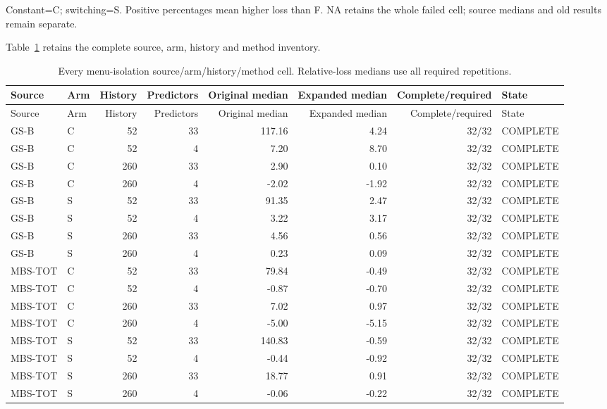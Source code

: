 \documentclass[10pt,a4paper]{article}
\begin{document}
\par\smallskip\noindent\begin{minipage}{\linewidth}\footnotesize Constant=C; switching=S. Positive percentages mean higher loss than F. NA retains the whole failed cell; source medians and old results remain separate.\end{minipage}
Table~\ref{tab:v10-menu-full} retains the complete source, arm, history and method inventory.
\begingroup\scriptsize\renewcommand{\arraystretch}{.96}
\begin{longtable}{llrrrrrl}
\caption{Every menu-isolation source/arm/history/method cell. Relative-loss medians use all required repetitions.}\label{tab:v10-menu-full}\\
\toprule Source & Arm & History & Predictors & Original median & Expanded median & Complete/required & State \\\midrule\endfirsthead
\toprule Source & Arm & History & Predictors & Original median & Expanded median & Complete/required & State \\\midrule\endhead
GS-B & C & 52 & 33 & 117.16 & 4.24 & 32/32 & COMPLETE \\
GS-B & C & 52 & 4 & 7.20 & 8.70 & 32/32 & COMPLETE \\
GS-B & C & 260 & 33 & 2.90 & 0.10 & 32/32 & COMPLETE \\
GS-B & C & 260 & 4 & -2.02 & -1.92 & 32/32 & COMPLETE \\
GS-B & S & 52 & 33 & 91.35 & 2.47 & 32/32 & COMPLETE \\
GS-B & S & 52 & 4 & 3.22 & 3.17 & 32/32 & COMPLETE \\
GS-B & S & 260 & 33 & 4.56 & 0.56 & 32/32 & COMPLETE \\
GS-B & S & 260 & 4 & 0.23 & 0.09 & 32/32 & COMPLETE \\
MBS-TOT & C & 52 & 33 & 79.84 & -0.49 & 32/32 & COMPLETE \\
MBS-TOT & C & 52 & 4 & -0.87 & -0.70 & 32/32 & COMPLETE \\
MBS-TOT & C & 260 & 33 & 7.02 & 0.97 & 32/32 & COMPLETE \\
MBS-TOT & C & 260 & 4 & -5.00 & -5.15 & 32/32 & COMPLETE \\
MBS-TOT & S & 52 & 33 & 140.83 & -0.59 & 32/32 & COMPLETE \\
MBS-TOT & S & 52 & 4 & -0.44 & -0.92 & 32/32 & COMPLETE \\
MBS-TOT & S & 260 & 33 & 18.77 & 0.91 & 32/32 & COMPLETE \\
MBS-TOT & S & 260 & 4 & -0.06 & -0.22 & 32/32 & COMPLETE \\

\end{longtable}
\end{document}
